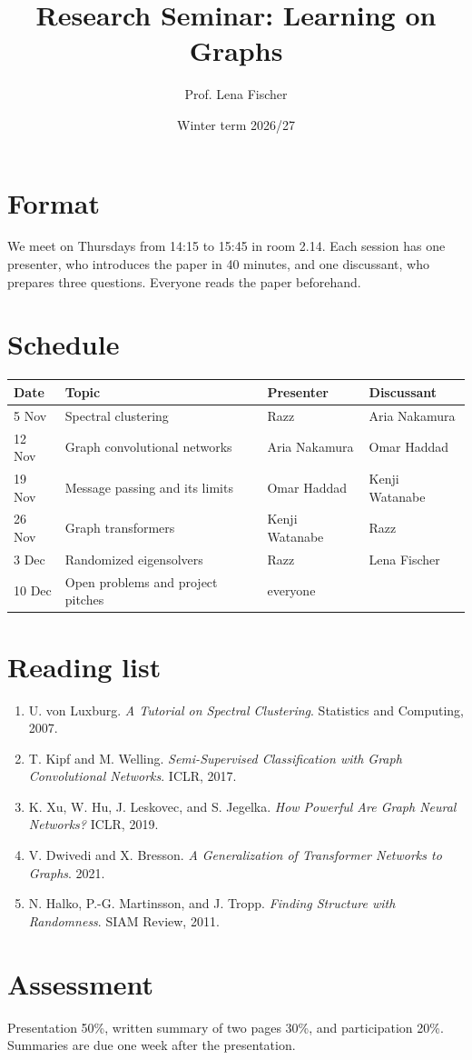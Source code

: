\documentclass[11pt,a4paper]{article}
\title{Research Seminar: Learning on Graphs}
\author{Prof. Lena Fischer}
\date{Winter term 2026/27}
\begin{document}
\maketitle

\section*{Format}

We meet on Thursdays from 14:15 to 15:45 in room 2.14. Each session has one presenter, who introduces the paper in 40 minutes, and one discussant, who prepares three questions. Everyone reads the paper beforehand.

\section*{Schedule}

\begin{center}
  \begin{tabular}{llll}
    \toprule
    Date & Topic & Presenter & Discussant \\
    \midrule
    5 Nov & Spectral clustering & Razz & Aria Nakamura \\
    12 Nov & Graph convolutional networks & Aria Nakamura & Omar Haddad \\
    19 Nov & Message passing and its limits & Omar Haddad & Kenji Watanabe \\
    26 Nov & Graph transformers & Kenji Watanabe & Razz \\
    3 Dec & Randomized eigensolvers & Razz & Lena Fischer \\
    10 Dec & Open problems and project pitches & everyone & \\
    \bottomrule
  \end{tabular}
\end{center}

\section*{Reading list}

\begin{enumerate}[leftmargin=1.5em]
  \item U. von Luxburg. \emph{A Tutorial on Spectral Clustering}. Statistics and Computing, 2007.
  \item T. Kipf and M. Welling. \emph{Semi-Supervised Classification with Graph Convolutional Networks}. ICLR, 2017.
  \item K. Xu, W. Hu, J. Leskovec, and S. Jegelka. \emph{How Powerful Are Graph Neural Networks?} ICLR, 2019.
  \item V. Dwivedi and X. Bresson. \emph{A Generalization of Transformer Networks to Graphs}. 2021.
  \item N. Halko, P.-G. Martinsson, and J. Tropp. \emph{Finding Structure with Randomness}. SIAM Review, 2011.
\end{enumerate}

\section*{Assessment}

Presentation 50\%, written summary of two pages 30\%, and participation 20\%. Summaries are due one week after the presentation.
\end{document}
